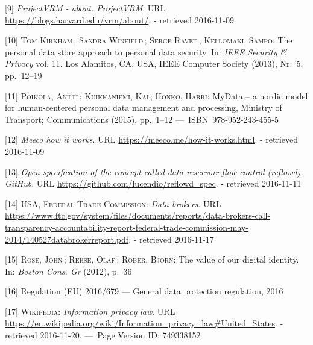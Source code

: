 \documentclass[12pt,english,a4paper,titlepage,cleardoublepage=empty,dottedtoc]{report}
\begin{document}
\hypertarget{ref-web_2010_projectvrm_about}{}
{[}9{]} \emph{ProjectVRM - about. ProjectVRM}. URL
\url{https://blogs.harvard.edu/vrm/about/}. - retrieved 2016-11-09

\hypertarget{ref-paper_2013_the-personal-data-store-approach-to-personal-data-security_2013}{}
{[}10{]} \textsc{Tom Kirkham}\,; \textsc{Sandra Winfield}\,;
\textsc{Serge Ravet}\,; \textsc{Kellomaki, Sampo}: The personal data
store approach to personal data security. In: \emph{IEEE Security \&
Privacy} vol. 11. Los Alamitos, CA, USA, IEEE Computer Society (2013),
Nr.~5, pp.~12--19

\hypertarget{ref-whitepaper_2014_mydata-a-nordic-model-for-human-centered-personal-data-management-and-processing}{}
{[}11{]} \textsc{Poikola, Antti}\,; \textsc{Kuikkaniemi, Kai}\,;
\textsc{Honko, Harri}: MyData -- a nordic model for human-centered
personal data management and processing, Ministry of Transport;
Communications (2015), pp.~1--12 ---~ISBN~978-952-243-455-5

\hypertarget{ref-web_2016_meeco-how-it-works}{}
{[}12{]} \emph{Meeco how it works}. URL
\url{https://meeco.me/how-it-works.html}. - retrieved 2016-11-09

\hypertarget{ref-repo_2016_reflowd-spec}{}
{[}13{]} \emph{Open specification of the concept called data reservoir
flow control (reflowd). GitHub}. URL
\url{https://github.com/lucendio/reflowd_spec}. - retrieved 2016-11-11

\hypertarget{ref-report_2014_data-brokers}{}
{[}14{]} \textsc{USA, Federal Trade Commission}: \emph{Data brokers}.
URL
\url{https://www.ftc.gov/system/files/documents/reports/data-brokers-call-transparency-accountability-report-federal-trade-commission-may-2014/140527databrokerreport.pdf}.
- retrieved 2016-11-17

\hypertarget{ref-whitepaper_2012_the-value-of-our-digital-identity_definition}{}
{[}15{]} \textsc{Rose, John}\,; \textsc{Rehse, Olaf}\,; \textsc{Röber,
Björn}: The value of our digital identity. In: \emph{Boston Cons. Gr}
(2012), p.~36

\hypertarget{ref-regulation_2016_eu_general-data-protection-regulation_definition}{}
{[}16{]} Regulation (EU) 2016/679 --- General data protection
regulation, 2016

\hypertarget{ref-web_2016_wikipedia_information-privacy-law_us}{}
{[}17{]} \textsc{Wikipedia}: \emph{Information privacy law}. URL
\url{https://en.wikipedia.org/wiki/Information_privacy_law\#United_States}.
- retrieved 2016-11-20. ---~Page Version ID: 749338152
\end{document}
